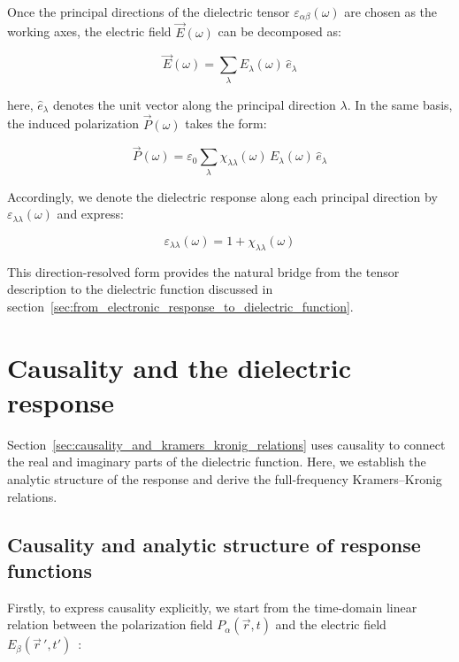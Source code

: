Once the principal directions of the dielectric tensor $\varepsilon_{\alpha\beta}(\omega)$ are chosen as the working axes, the electric field $\vec{E}(\omega)$ can be decomposed as:

\begin{equation}
    \vec{E}(\omega)=\sum_{\lambda}E_{\lambda}(\omega)\,\hat{e}_{\lambda}
\label{electric_field_decomposition_principal_directions}
\end{equation}

here, $\hat{e}_{\lambda}$ denotes the unit vector along the principal direction $\lambda$.
In the same basis, the induced polarization $\vec{P}(\omega)$ takes the form:

\begin{equation}
    \vec{P}(\omega)=\varepsilon_0\sum_{\lambda}\chi_{\lambda\lambda}(\omega)\,E_{\lambda}(\omega)\,\hat{e}_{\lambda}
\label{polarization_decomposition_principal_directions}
\end{equation}

Accordingly, we denote the dielectric response along each principal direction by $\varepsilon_{\lambda\lambda}(\omega)$ and express:

\begin{equation}
    \varepsilon_{\lambda\lambda}(\omega)=1+\chi_{\lambda\lambda}(\omega)
\label{direction_resolved_dielectric_response}
\end{equation}

This direction-resolved form provides the natural bridge from the tensor description to the dielectric function discussed in section~\ref{sec:from_electronic_response_to_dielectric_function}.

\newpage
\section{Causality and the dielectric response}
\label{sec:causality_derivation_basic}

Section~\ref{sec:causality_and_kramers_kronig_relations} uses causality to connect the real and imaginary parts of the dielectric function.
Here, we establish the analytic structure of the response and derive the full-frequency Kramers--Kronig relations.

\subsection{Causality and analytic structure of response functions}

Firstly, to express causality explicitly, 
we start from the time-domain linear relation between
the polarization field $P_{\alpha}(\vec{r},t)$ and
the electric field $E_{\beta}(\vec{r}\,',t')$~\cite{dressel2002electrodynamics}:

